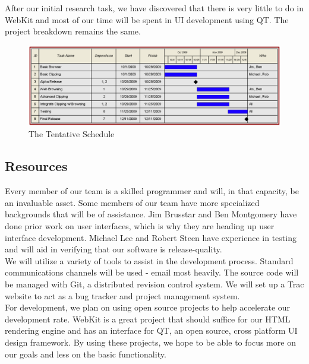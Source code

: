 \documentclass[12pt]{article}
\begin{document}
After our initial research task, we have discovered that there is very little to do in WebKit and most of our time will be spent in UI development using QT. The project breakdown remains the same.
\begin{figure}[htp]
\centering
\includegraphics{RoadMap.png}
\caption[Tentative Schedule]{The Tentative Schedule}\label{fig:roadmap}
\end{figure}
\subsection{Resources} %
\label{sub:resources}
Every member of our team is a skilled programmer and will, in that capacity, be an invaluable asset. Some members of our team have more specialized backgrounds that will be of assistance. Jim Brusstar and Ben Montgomery have done prior work on user interfaces, which is why they are heading up user interface development. Michael Lee and Robert Steen have experience in testing and will aid in verifying that our software is release-quality.\\

We will utilize a variety of tools to assist in the development process. Standard communications channels will be used - email most heavily. The source code will be managed with Git, a distributed revision control system. We will set up a Trac website to act as a bug tracker and project management system.\\

For development, we plan on using open source projects to help accelerate our development rate. WebKit is a great project that should suffice for our HTML rendering engine and has an interface for QT, an open source, cross platform UI design framework. By using these projects, we hope to be able to focus more on our goals and less on the basic functionality.
\end{document}

